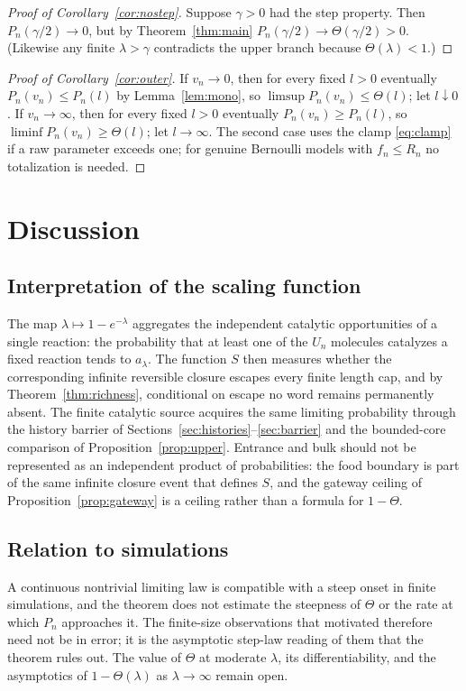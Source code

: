 \documentclass[11pt,reqno]{amsart}
\theoremstyle{plain}
\theoremstyle{definition}
\theoremstyle{remark}
\numberwithin{equation}{section}
\newcommand{\clam}{a_\lambda}
\begin{document}
\begin{proof}[Proof of Corollary~\ref{cor:nostep}]
Suppose $\gamma>0$ had the step property. Then $P_n(\gamma/2)\to0$, but by Theorem~\ref{thm:main} $P_n(\gamma/2)\to\Theta(\gamma/2)>0$. (Likewise any finite $\lambda>\gamma$ contradicts the upper branch because $\Theta(\lambda)<1$.)
\end{proof}

\begin{proof}[Proof of Corollary~\ref{cor:outer}]
If $v_n\to0$, then for every fixed $l>0$ eventually $P_n(v_n)\le P_n(l)$ by Lemma~\ref{lem:mono}, so $\limsup P_n(v_n)\le\Theta(l)$; let $l\downarrow0$. If $v_n\to\infty$, then for every fixed $l>0$ eventually $P_n(v_n)\ge P_n(l)$, so $\liminf P_n(v_n)\ge\Theta(l)$; let $l\to\infty$. The second case uses the clamp \eqref{eq:clamp} if a raw parameter exceeds one; for genuine Bernoulli models with $f_n\le R_n$ no totalization is needed.
\end{proof}

\section{Discussion}\label{sec:discussion}

\subsection*{Interpretation of the scaling function}
The map $\lambda\mapsto1-e^{-\lambda}$ aggregates the independent catalytic opportunities of a single reaction: the probability that at least one of the $U_n$ molecules catalyzes a fixed reaction tends to $\clam$. The function $S$ then measures whether the corresponding infinite reversible closure escapes every finite length cap, and by Theorem~\ref{thm:richness}, conditional on escape no word remains permanently absent. The finite catalytic source acquires the same limiting probability through the history barrier of Sections~\ref{sec:histories}--\ref{sec:barrier} and the bounded-core comparison of Proposition~\ref{prop:upper}. Entrance and bulk should not be represented as an independent product of probabilities: the food boundary is part of the same infinite closure event that defines $S$, and the gateway ceiling of Proposition~\ref{prop:gateway} is a ceiling rather than a formula for $1-\Theta$.

\subsection*{Relation to simulations}
A continuous nontrivial limiting law is compatible with a steep onset in finite simulations, and the theorem does not estimate the steepness of $\Theta$ or the rate at which $P_n$ approaches it. The finite-size observations that motivated \cite{hordijk2016variable} therefore need not be in error; it is the asymptotic step-law reading of them that the theorem rules out. The value of $\Theta$ at moderate $\lambda$, its differentiability, and the asymptotics of $1-\Theta(\lambda)$ as $\lambda\to\infty$ remain open.
\end{document}
